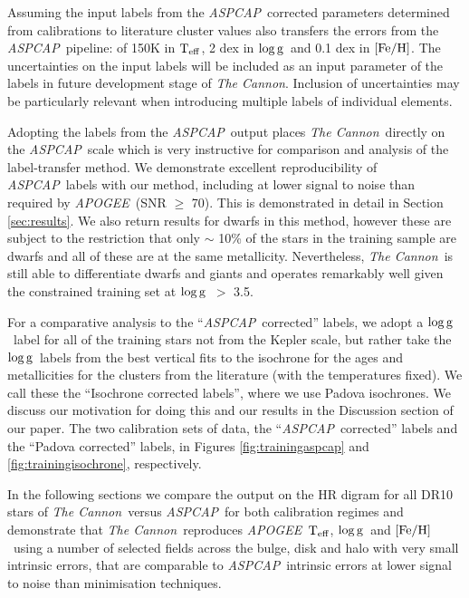 \documentclass[12pt, preprint]{aastex}
\newcommand{\teff}{\mbox{$\rm T_{eff}$}}
\newcommand{\feh}{\mbox{$\rm [Fe/H]$}}
\newcommand{\logg}{\mbox{$\rm \log g$}}
\newcommand{\tc}{\textsl{The Cannon}}
\newcommand{\apogee}{\textsl{APOGEE}}
\newcommand{\aspcap}{\textsl{ASPCAP}}
\begin{document}
Assuming the input labels from the \aspcap\ corrected parameters determined from calibrations to literature cluster values also transfers the errors from the \aspcap\ pipeline: of 150K in \teff,  2 dex in \logg\ and 0.1 dex in \feh.   The uncertainties on the input labels will be included as an input parameter of the labels in future development stage of \tc. Inclusion of uncertainties may be particularly relevant when introducing multiple labels of individual elements. 

Adopting the labels from the \aspcap\ output places \tc\ directly on the \aspcap\ scale which is very instructive for comparison and analysis of the label-transfer method. We demonstrate excellent reproducibility of \aspcap\ labels with our method, including at lower signal to noise than required by \apogee\ (SNR $\ge$ 70). This is demonstrated in detail in Section \ref{sec:results}. We also return results for dwarfs in this method, however these are subject to the restriction that only $\sim$ 10\% of the stars in the training sample are dwarfs and all of these are at the same metallicity. Nevertheless, \tc\ is still able to differentiate dwarfs and giants and operates remarkably well given the constrained training set at \logg\ $>$ 3.5. 

For a comparative analysis to the ``\aspcap\ corrected'' labels, we adopt a \logg\ label for all of the training stars not from the Kepler scale, but rather take the \logg\ labels from the best vertical fits to the isochrone for the ages and metallicities for the clusters from the literature (with the temperatures fixed). We call these the ``Isochrone corrected labels'', where we use Padova isochrones. We discuss our motivation for doing this and our results in the Discussion section of our paper.  The two calibration sets of data, the ``\aspcap\ corrected'' labels and the ``Padova corrected'' labels, in Figures \ref{fig:trainingaspcap} and \ref{fig:trainingisochrone}, respectively. 

In the following sections we compare the output on the HR digram for all DR10 stars of \tc\ versus \aspcap\ for both calibration regimes and demonstrate that \tc\ reproduces \apogee\ \teff, \logg\ and \feh\ using a number of selected fields across the bulge, disk and halo with very small intrinsic errors, that are comparable to \aspcap\ intrinsic errors at lower signal to noise than minimisation techniques.
\end{document}
